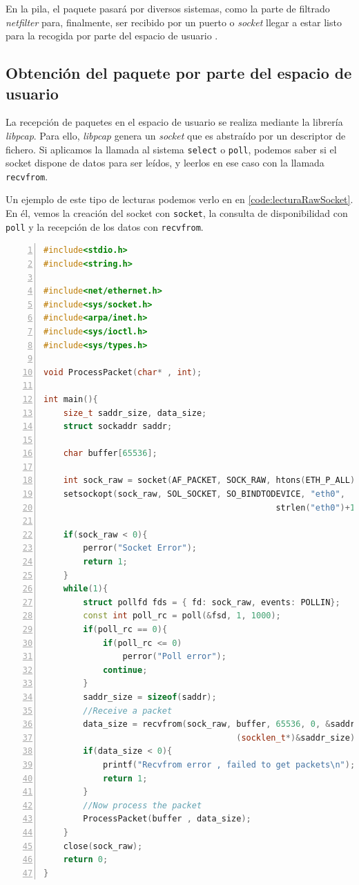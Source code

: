 En la pila, el paquete pasará por diversos sistemas, como la parte de filtrado 
\emph{\gls{netfilter}} para, finalmente, ser recibido por un puerto o \emph{\gls{socket}} llegar a 
estar listo para la recogida por parte del espacio de usuario \cite{p206}.

\subsection{Obtención del paquete por parte del espacio de usuario}
La recepción de paquetes en el espacio de usuario se realiza mediante la librería \emph{\gls{libpcap}}.
Para ello, \emph{\gls{libpcap}} genera un \emph{\gls{socket}} que es abstraído por un descriptor de fichero. Si 
aplicamos la llamada al sistema \texttt{select} o \texttt{poll}, podemos saber si el socket dispone de datos para ser 
leídos, y leerlos en ese caso con la llamada \texttt{recvfrom}.

Un ejemplo de este tipo de lecturas podemos verlo en en \lstlistingname{}\ref{code:lecturaRawSocket}. En él, vemos la 
creación del socket con \texttt{socket}, la consulta de disponibilidad con \texttt{poll} y la recepción de los datos 
con \texttt{recvfrom}.

\begin{lstlisting}[language=C++,caption={Lectura desde un socket crudo}, 
breaklines=true, label=code:lecturaRawSocket,numbers=left,float=htbp]
#include<stdio.h>
#include<string.h>

#include<net/ethernet.h>
#include<sys/socket.h>
#include<arpa/inet.h>
#include<sys/ioctl.h>
#include<sys/types.h>
 
void ProcessPacket(char* , int);
 
int main(){
    size_t saddr_size, data_size;
    struct sockaddr saddr;
         
    char buffer[65536];
   
    int sock_raw = socket(AF_PACKET, SOCK_RAW, htons(ETH_P_ALL));
    setsockopt(sock_raw, SOL_SOCKET, SO_BINDTODEVICE, "eth0", 
                                               strlen("eth0")+1);
     
    if(sock_raw < 0){
        perror("Socket Error");
        return 1;
    }
    while(1){
        struct pollfd fds = { fd: sock_raw, events: POLLIN};
        const int poll_rc = poll(&fsd, 1, 1000);
        if(poll_rc == 0){
            if(poll_rc <= 0)
                perror("Poll error");
            continue;
        }
        saddr_size = sizeof(saddr);
        //Receive a packet
        data_size = recvfrom(sock_raw, buffer, 65536, 0, &saddr, 
                                       (socklen_t*)&saddr_size);
        if(data_size < 0){
            printf("Recvfrom error , failed to get packets\n");
            return 1;
        }
        //Now process the packet
        ProcessPacket(buffer , data_size);
    }
    close(sock_raw);
    return 0;
}
\end{lstlisting}

